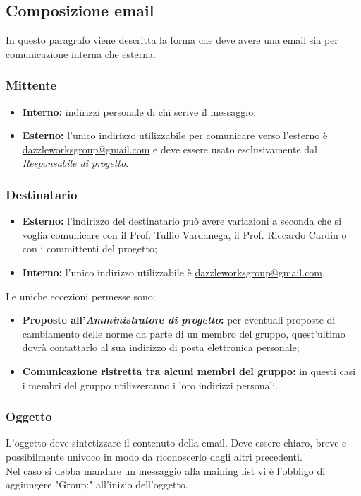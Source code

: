 	\subsection{Composizione email}
In questo paragrafo viene descritta la forma che deve avere una email sia per comunicazione interna che esterna.
		\subsubsection{Mittente}
\begin{itemize}
	\item \textbf{Interno:} indirizzi personale di chi scrive il messaggio;
	\item \textbf{Esterno:} l'unico indirizzo utilizzabile per comunicare verso l'esterno è \url{dazzleworksgroup@gmail.com} e deve essere usato esclusivamente dal \textit{Responsabile di progetto}.
\end{itemize}
	\subsubsection{Destinatario}
\begin{itemize}
	\item \textbf{Esterno:} l'indirizzo del destinatario può avere variazioni a seconda che si voglia comunicare con il Prof. Tullio Vardanega, il Prof. Riccardo Cardin o con i committenti del progetto;
	\item \textbf{Interno:} l'unico indirizzo utilizzabile è \url{dazzleworksgroup@gmail.com}.
\end{itemize}
Le uniche eccezioni permesse sono:
\begin{itemize}
	\item \textbf{Proposte all'\textit{Amministratore di progetto}:} per eventuali proposte di cambiamento delle norme da parte di un membro del gruppo, quest'ultimo dovrà contattarlo al sua indirizzo di posta elettronica personale;
	\item \textbf{Comunicazione ristretta tra alcuni membri del gruppo:} in questi casi i membri del gruppo utilizzeranno i loro indirizzi personali.
\end{itemize}

		\subsubsection{Oggetto}
L'oggetto deve sintetizzare il contenuto della email. Deve essere chiaro, breve e possibilmente univoco in modo da riconoscerlo dagli altri precedenti.\\
Nel caso si debba mandare un messaggio alla \gls{maining list} vi è l'obbligo di aggiungere "Group:" all'inizio dell'oggetto.
